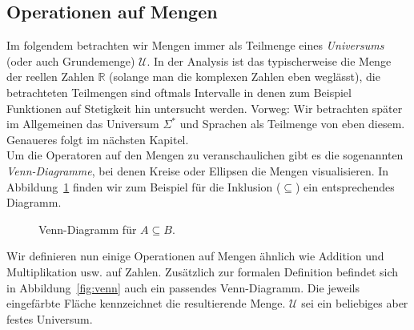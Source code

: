 \documentclass[11pt, a4paper]{article}
\theoremstyle{definition}
\theoremstyle{plain}
\numberwithin{equation}{section}
\begin{document}
\subsection{Operationen auf Mengen}\label{sec:pre_setops}
Im folgendem betrachten wir Mengen immer als Teilmenge eines \textit{Universums} (oder auch Grundemenge) \( \mathcal{U} \). In der Analysis ist das typischerweise die Menge der reellen Zahlen \( \mathbb{R} \) (solange man die komplexen Zahlen eben weglässt), die betrachteten Teilmengen sind oftmals Intervalle in denen zum Beispiel Funktionen auf Stetigkeit hin untersucht werden. Vorweg: Wir betrachten später im Allgemeinen das Universum \( \Sigma^\ast \) und Sprachen als Teilmenge von eben diesem. Genaueres folgt im nächsten Kapitel.\\
Um die Operatoren auf den Mengen zu veranschaulichen gibt es die sogenannten \textit{Venn-Diagramme}, bei denen Kreise oder Ellipsen die Mengen visualisieren. In Abbildung~\ref{fig:venn_subset} finden wir zum Beispiel für die Inklusion (\( \subseteq \)) ein entsprechendes Diagramm.
\begin{figure}
	\centering
	
	\caption{Venn-Diagramm für \( A \subseteq B \).}
	\label{fig:venn_subset}
\end{figure}
Wir definieren nun einige Operationen auf Mengen ähnlich wie Addition und Multiplikation usw. auf Zahlen. Zusätzlich zur formalen Definition befindet sich in Abbildung~\ref{fig:venn} auch ein passendes Venn-Diagramm. Die jeweils eingefärbte Fläche kennzeichnet die resultierende Menge. \( \mathcal{U} \) sei ein beliebiges aber festes Universum.
\end{document}
